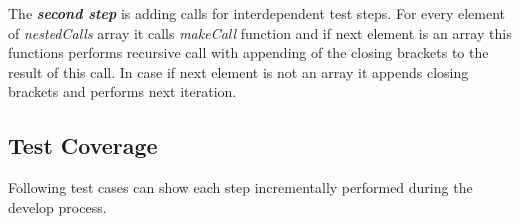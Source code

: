 The \textit{\textbf{second step}} is adding calls for interdependent test steps. For every  element of \textit{nestedCalls} array it calls \textit{makeCall} function and if next element is an array this functions performs recursive call with appending of the closing brackets to the result of this call. In case if next element is not an array it appends closing brackets and performs next iteration.

%
%




\subsection{Test Coverage}
Following test cases can show each step incrementally performed during the develop process.

%

